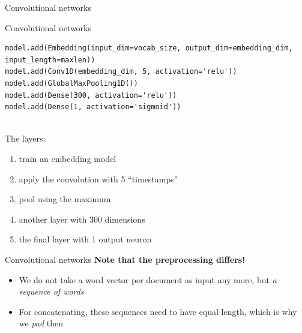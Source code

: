 \documentclass[compress]{beamer}
\begin{document}
\begin{frame}{Convolutional networks}
	
\end{frame}



\begin{frame}[fragile]{Convolutional networks}
	\begin{lstlisting}
model.add(Embedding(input_dim=vocab_size, output_dim=embedding_dim, input_length=maxlen))
model.add(Conv1D(embedding_dim, 5, activation='relu'))
model.add(GlobalMaxPooling1D())
model.add(Dense(300, activation='relu'))
model.add(Dense(1, activation='sigmoid'))
		
	\end{lstlisting}	
	The layers:	
	\begin{enumerate}[<+->]
		\item train an embedding model
		\item apply the convolution with 5 ``timestamps''
		\item pool using the maximum
		\item another layer with 300 dimensions
		\item the final layer with 1 output neuron
	\end{enumerate}
\end{frame}


\begin{frame}{Convolutional networks}
	\textbf{Note that the preprocessing differs!}
	
	\begin{itemize}
		\item We do not take a word vector per document as input any more, but \emph{a sequence of words}
		\item For concatenating, these sequences need to have equal length, which is why we \emph{pad} then
	\end{itemize}
	
\end{frame}
\end{document}
